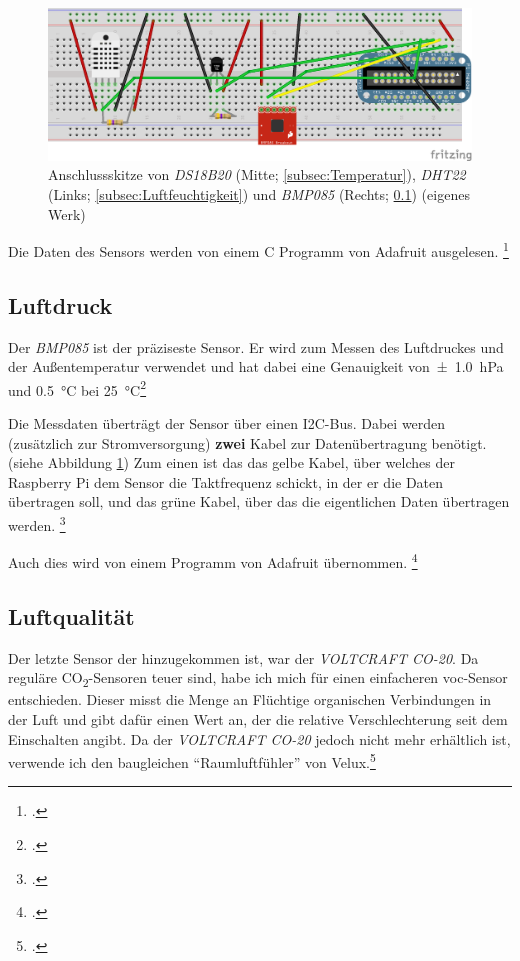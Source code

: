 \begin{figure}[h]
  \centering
     \includegraphics[width=\textwidth]{figures/steckbrett.png}
  \caption{Anschlussskitze von \textit{DS18B20} (Mitte; \ref{subsec:Temperatur}), \textit{DHT22} (Links; \ref{subsec:Luftfeuchtigkeit}) und \textit{BMP085} (Rechts; \ref{subsec:Luftdruck}) (eigenes Werk)}
  \label{fig:steckbrett}
\end{figure}

Die Daten des Sensors werden von einem \gls{C} Programm von Adafruit ausgelesen.
\footcite[Software Install]{DHT}

\subsection{Luftdruck}
\label{subsec:Luftdruck}

Der \textit{BMP085} ist der präziseste Sensor. Er wird zum Messen des Luftdruckes und der Außentemperatur verwendet und hat dabei eine Genauigkeit von\SI{\pm 1.0}{\hecto\pascal} und \SI{0.5}{\degreeCelsius} bei \SI{25}{\degreeCelsius}\footcite[6]{BMP085}

Die Messdaten überträgt der Sensor über einen \gls{I2C}-Bus. Dabei werden (zusätzlich zur Stromversorgung) \textbf{zwei} Kabel zur Datenübertragung benötigt. (siehe Abbildung \ref{fig:steckbrett})
Zum einen ist das das gelbe Kabel, über welches der Raspberry Pi dem Sensor die Taktfrequenz schickt, in der er die Daten übertragen soll, und das grüne Kabel, über das die eigentlichen Daten übertragen werden.
\footcite[Hooking Everything Up]{bmp058_adafruit}

Auch dies wird von einem Programm von Adafruit übernommen. \footcite[Using the Adafruit BMP Python Library (Updated)]{bmp058_adafruit}

\subsection{Luftqualität}
\label{subsec:Luftqualitat}
Der letzte Sensor der hinzugekommen ist, war der \textit{VOLTCRAFT CO-20}. Da reguläre CO\textsubscript{2}-Sensoren teuer sind, habe ich mich für einen einfacheren \acrshort{voc}-Sensor entschieden. Dieser misst die Menge an Flüchtige organischen Verbindungen in der Luft und gibt dafür einen Wert an, der die relative Verschlechterung seit dem Einschalten angibt. Da der \textit{VOLTCRAFT CO-20} jedoch nicht mehr erhältlich ist, verwende ich den baugleichen \enquote{Raumluftfühler} von Velux.\footcite{Velux}

